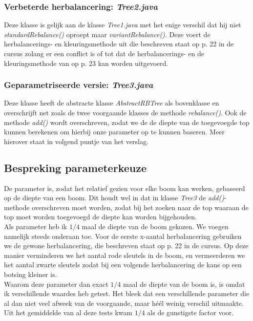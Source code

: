 \documentclass[11pt,a4paper]{report}
\begin{document}
\subsubsection*{Verbeterde herbalancering: \textsl{Tree2.java}}
Deze klasse is gelijk aan de klasse \textsl{Tree1.java}  met het enige verschil dat hij niet \textsl{standardRebalance()} oproept maar \textsl{variantRebalance()}. Deze voert de herbalancerings- en kleuringsmethode uit die beschreven staat op p. 22 in de cursus zolang er een conflict is of tot dat de herbalancerings- en de kleuringsmethode van op p. 23 kan worden uitgevoerd.
\subsubsection*{Geparametriseerde versie: \textsl{Tree3.java}}
Deze klasse heeft de abstracte klasse \textsl{AbstractRBTree} als bovenklasse en overschrijft net zoals de twee voorgaande klasses de methode \textsl{rebalance()}. Ook de methode \textsl{add()} wordt overschreven, zodat we de de diepte van de toegevoegde top kunnen berekenen om hierbij onze parameter op te kunnen baseren. Meer hierover staat in volgend puntje van het verslag.\\

\subsection{Bespreking parameterkeuze}
De parameter is, zodat het relatief gezien voor elke boom kan werken, gebaseerd op de diepte van een boom. Dit houdt wel in dat in klasse \textsl{Tree3} de \textsl{add()}-methode overschreven moet worden, zodat bij het zoeken naar de top waaraan de top moet worden toegevoegd de diepte kan worden bijgehouden.\\
Als parameter heb ik $1/4$ maal de diepte van de boom gekozen. We voegen namelijk steeds onderaan toe. Voor de eerste x-aantal herbalancering gebruiken we de gewone herbalancering, die beschreven staat op p. 22 in de cursus. Op deze manier verminderen we het aantal rode sleutels in de boom, en vermeerderen we het aantal zwarte sleutels zodat bij een volgende herbalancering de kans op een botsing kleiner is.\\
Waarom deze parameter dan exact $1/4$ maal de diepte van de boom is, is omdat ik verschillende waardes heb getest. Het bleek dat een verschillende parameter die al dan niet veel afweek van de voorgaande, maar h\'e\'el weinig verschil uitmaakte. Uit het gemiddelde van al deze tests kwam $1/4$ als de gunstigste factor voor.
\end{document}
